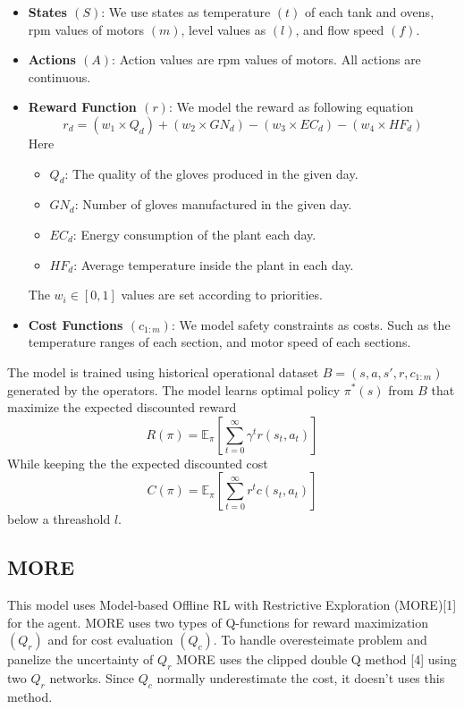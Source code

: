 \documentclass{article}
\newcommand{\E}{\mathbb E}
\begin{document}
\begin{itemize}
  \item \textbf{States \((S)\)}: We use states as temperature \((t)\) of each tank and ovens, rpm values of motors
   \((m)\), level values as \((l)\), and flow speed \((f)\).
  \item \textbf{Actions \((A)\)}: Action values are rpm values of motors. All actions are continuous.
  \item \textbf{Reward Function \((r)\)}: We model the reward as following equation
    \[r_d = (w_1 \times Q_d) + (w_2 \times {GN}_d) - (w_3 \times {EC}_d) - (w_4 \times {HF}_d)\]
    Here 
    \begin{itemize}
      \item \(Q_d\): The quality of the gloves produced in the given day.
      \item \({GN}_d\): Number of gloves manufactured in the given day.
      \item \({EC}_d\): Energy consumption of the plant each day.
      \item \({HF}_d\): Average temperature inside the plant in each day.
    \end{itemize}
    The \(w_i \in [0,1]\) values are set according to priorities.
  \item \textbf{Cost Functions \((c_{1:m})\)}: We model safety constraints as costs. Such as the temperature ranges
  of each section, and motor speed of each sections.
\end{itemize}

The model is trained using historical operational dataset \(B = (s, a, s', r, c_{1:m})\) generated by the operators.
The model learns optimal policy \(\pi^{*}(s)\) from \(B\) that maximize the expected discounted reward 
\[R(\pi) = \E_{\pi}\left[\sum_{t=0}^{\infty} \gamma^t r(s_t, a_t)\right]\]
While keeping the the expected discounted cost 
\[C(\pi) = \E_{\pi}\left[\sum_{t=0}^{\infty} r^t c(s_t,a_t)\right]\]
below a threashold \(l\).

\subsection{MORE}
This model uses Model-based Offline RL with Restrictive Exploration (MORE)[1] for the agent. MORE uses two types of 
Q-functions for reward maximization \((Q_r)\) and for cost evaluation \((Q_c)\). To handle overesteimate problem and 
panelize the uncertainty of \(Q_r\) MORE uses the clipped double Q method [4] using two \(Q_r\) networks. 
Since \(Q_c\) normally underestimate the cost, it doesn't uses this method. 
\end{document}

